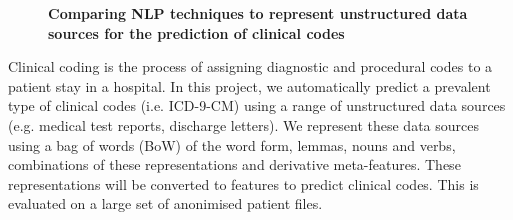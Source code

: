 \documentclass[10pt, a4paper, twopage, headinclude, footinclude, BCOR5mm]{book}
\begin{document}
\newpage

\begin{figure}[t!]
\centering
\large\textbf{Comparing NLP techniques to represent unstructured data sources for the prediction of clinical codes}
\vspace*{0.5cm}
\end{figure}


\begin{table}[t!]
\end{table} 
\begin{table}[t!]
\end{table} 
\noindent
Clinical coding is the process of assigning diagnostic and procedural codes to a patient stay in a hospital. In this project, we automatically predict a prevalent type of clinical codes (i.e. ICD-9-CM) using a range of unstructured data sources (e.g. medical test reports, discharge letters). We represent these data sources using a bag of words (BoW) of the word form, lemmas, nouns and verbs, combinations of these representations and derivative meta-features. These representations will be converted to features to predict clinical codes. This is evaluated on a large set of anonimised patient files.  

\newpage
\end{document}
